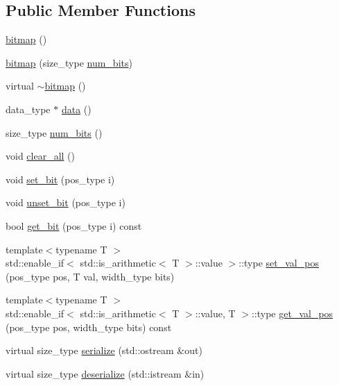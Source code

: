 \subsection*{Public Member Functions}
\begin{DoxyCompactItemize}
\item 
\hyperlink{classdialog_1_1bitmap_ab1f8ca9bf43679bbe7a60565d24fdbed}{bitmap} ()
\item 
\hyperlink{classdialog_1_1bitmap_a24d0f574de691d0a6a49042250b70402}{bitmap} (size\+\_\+type \hyperlink{classdialog_1_1bitmap_a2066fd879c2e7c3d18ff590e9f1826b8}{num\+\_\+bits})
\item 
virtual \hyperlink{classdialog_1_1bitmap_a4d7df482fe800db8e7003ea7f1d29df5}{$\sim$bitmap} ()
\item 
data\+\_\+type $\ast$ \hyperlink{classdialog_1_1bitmap_a0b900d1a8caeda35213c8891e092c61a}{data} ()
\item 
size\+\_\+type \hyperlink{classdialog_1_1bitmap_a2066fd879c2e7c3d18ff590e9f1826b8}{num\+\_\+bits} ()
\item 
void \hyperlink{classdialog_1_1bitmap_a560fd4286efbe1d770926a4ceccc3d9a}{clear\+\_\+all} ()
\item 
void \hyperlink{classdialog_1_1bitmap_abeda36a2708d0b87296f7c4322357421}{set\+\_\+bit} (pos\+\_\+type i)
\item 
void \hyperlink{classdialog_1_1bitmap_a60bf0ac8d398e48e8f3c467999d0b1c8}{unset\+\_\+bit} (pos\+\_\+type i)
\item 
bool \hyperlink{classdialog_1_1bitmap_a50fa02f2e4a94c567f67761988c78d7f}{get\+\_\+bit} (pos\+\_\+type i) const
\item 
{\footnotesize template$<$typename T $>$ }\\std\+::enable\+\_\+if$<$ std\+::is\+\_\+arithmetic$<$ T $>$\+::value $>$\+::type \hyperlink{classdialog_1_1bitmap_a567ec662fb5fa68399b3097cc63c44ea}{set\+\_\+val\+\_\+pos} (pos\+\_\+type pos, T val, width\+\_\+type bits)
\item 
{\footnotesize template$<$typename T $>$ }\\std\+::enable\+\_\+if$<$ std\+::is\+\_\+arithmetic$<$ T $>$\+::value, T $>$\+::type \hyperlink{classdialog_1_1bitmap_aa56b2e9be38fd068ac374f2f7a33120b}{get\+\_\+val\+\_\+pos} (pos\+\_\+type pos, width\+\_\+type bits) const
\item 
virtual size\+\_\+type \hyperlink{classdialog_1_1bitmap_af93ff2660d3b790eee85692a41bdb823}{serialize} (std\+::ostream \&out)
\item 
virtual size\+\_\+type \hyperlink{classdialog_1_1bitmap_a5c4c9a790b785bbc021d913a53cffe80}{deserialize} (std\+::istream \&in)
\end{DoxyCompactItemize}
